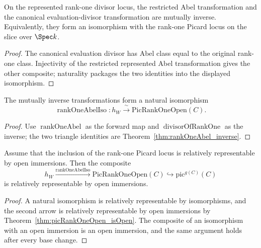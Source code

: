\begin{theorem}
  \label{thm:rankOneAbel_inverse}
  \leanok
  On the represented rank-one divisor locus, the restricted Abel transformation and the
  canonical evaluation-divisor transformation are mutually inverse.  Equivalently, they form
  an isomorphism with the rank-one Picard locus on the slice over \(\Spec k\).
\end{theorem}
\begin{proof}
  \leanok
  The canonical evaluation divisor has Abel class equal to the original rank-one class.
  Injectivity of the restricted represented Abel transformation gives the other composite;
  naturality packages the two identities into the displayed isomorphism.
\end{proof}

\begin{definition}
  \label{def:rankOneAbelIso}
  \leanok
  The mutually inverse transformations form a natural isomorphism
  \[
    \operatorname{rankOneAbelIso}\colon
      h_W\xrightarrow{\ \sim\ }\mathrm{PicRankOneOpen}(C).
  \]
\end{definition}
\begin{proof}
  \leanok
  Use \(\operatorname{rankOneAbel}\) as the forward map and
  \(\operatorname{divisorOfRankOne}\) as the inverse; the two triangle identities are
  Theorem~\ref{thm:rankOneAbel_inverse}.
\end{proof}

\begin{theorem}
  \label{thm:rankOneAbel_isOpenImmersion}
  \leanok
  Assume that the inclusion of the rank-one Picard locus is relatively representable by
  open immersions.  Then the composite
  \[
    h_W\xrightarrow{\operatorname{rankOneAbelIso}}
    \mathrm{PicRankOneOpen}(C)\hookrightarrow\mathrm{pic}^{g(C)}(C)
  \]
  is relatively representable by open immersions.
\end{theorem}
\begin{proof}
  \leanok
  A natural isomorphism is relatively representable by isomorphisms, and the second arrow is
  relatively representable by open immersions by
  Theorem~\ref{thm:picRankOneOpen_isOpen}.  The composite of an isomorphism with an open
  immersion is an open immersion, and the same argument holds after every base change.
\end{proof}

